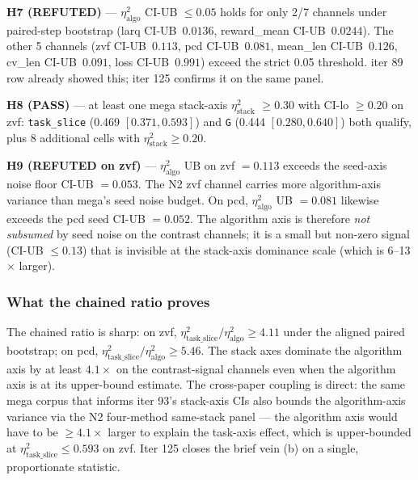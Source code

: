 \documentclass{article}  \usepackage[preprint,nonatbib]{neurips_2026} \usepackage[numbers]{natbib}
\begin{document}
\textbf{H7 (REFUTED)} --- $\eta^2_{\mathrm{algo}}$ CI-UB $\leq 0.05$ holds for
only 2/7 channels under paired-step bootstrap (larq CI-UB~$0.0136$,
reward\_mean CI-UB~$0.0244$). The other 5 channels (zvf CI-UB~$0.113$,
pcd CI-UB~$0.081$, mean\_len CI-UB~$0.126$, cv\_len CI-UB~$0.091$,
loss CI-UB~$0.991$) exceed the strict 0.05 threshold. iter 89 row
already showed this; iter 125 confirms it on the same panel.

\textbf{H8 (PASS)} --- at least one mega stack-axis $\eta^2_{\mathrm{stack}}$
$\geq 0.30$ with CI-lo $\geq 0.20$ on zvf: \texttt{task\_slice} (0.469
$[0.371, 0.593]$) and \texttt{G} (0.444 $[0.280, 0.640]$) both qualify,
plus 8 additional cells with $\eta^2_{\mathrm{stack}} \geq 0.20$.

\textbf{H9 (REFUTED on zvf)} --- $\eta^2_{\mathrm{algo}}$ UB on zvf
$= 0.113$ exceeds the seed-axis noise floor CI-UB
$= 0.053$. The N2 zvf channel carries more algorithm-axis variance
than mega's seed noise budget. On pcd, $\eta^2_{\mathrm{algo}}$ UB
$= 0.081$ likewise exceeds the pcd seed CI-UB $= 0.052$. The
algorithm axis is therefore \emph{not subsumed} by seed noise on the
contrast channels; it is a small but non-zero signal (CI-UB $\leq 0.13$)
that is invisible at the stack-axis dominance scale (which is 6--13$\times$
larger).

\subsubsection{What the chained ratio proves}
\label{sec:p5-iter125-what}
The chained ratio is sharp: on zvf, $\eta^2_{\mathrm{task\_slice}} /
\eta^2_{\mathrm{algo}} \geq 4.11$ under the aligned paired bootstrap;
on pcd, $\eta^2_{\mathrm{task\_slice}} / \eta^2_{\mathrm{algo}} \geq 5.46$.
The stack axes dominate the algorithm axis by at least $4.1\times$ on
the contrast-signal channels even when the algorithm axis is at its
upper-bound estimate. The cross-paper coupling is direct: the same
mega corpus that informs iter 93's stack-axis CIs also bounds the
algorithm-axis variance via the N2 four-method same-stack panel ---
the algorithm axis would have to be $\geq 4.1 \times$ larger to
explain the task-axis effect, which is upper-bounded at $\eta^2_{\mathrm{task\_slice}}
\leq 0.593$ on zvf. Iter 125 closes the brief vein (b) on a single,
proportionate statistic.
\end{document}
